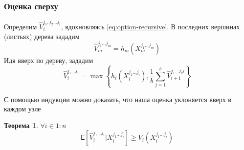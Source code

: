 \documentclass[12pt,twoside,titlepage,сa4paper]{article}
\newtheorem{theorem}{Теорема}
\begin{document}
		\subsubsection{Оценка сверху}
		\par Определим $\hat{V}_i^{j_1, j_2 \ldots j_i}$, вдохновляясь \ref{eq:option-recursive}. В последних вершинах (листьях) дерева зададим
		\begin{equation}\label{eq:upper-terminal}
			\hat{V}_m^{j_1 \ldots j_m} = h_m\left(X_m^{j_1 \ldots j_m}\right)
		\end{equation}
		Идя вверх по дереву, зададим
		\begin{equation}\label{eq:upper-node}
			\hat{V}_i^{j_1 \ldots j_i} = \max \left\lbrace h_i \left( X_i^{j_1 \ldots j_i} \right), \frac{1}{b} \sum_{j = 1}^b \hat{V}_{i+1}^{j_1 \ldots j_i j}\right\rbrace 
		\end{equation}
		\par С помощью индукции можно доказать, что наша оценка уклоняется вверх в каждом узле
		\begin{theorem}
			$\forall i \in 1:n$
			\begin{equation*}
			\mathsf{E}\left[\hat{V}_i^{j_1\ldots j_i}|X_i^{j_1\ldots j_i}\right] \geqslant V_i\left(X_i^{j_1\ldots j_i}\right)
			\end{equation*}
		\end{theorem}
\end{document}
